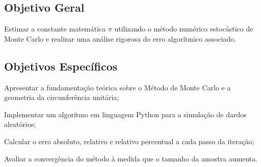 \subsection{Objetivo Geral}
Estimar a constante matemática \texorpdfstring{$\pi$}{pi} utilizando o método numérico estocástico de Monte Carlo e realizar uma análise rigorosa do erro algorítmico associado.

\subsection{Objetivos Específicos}
\begin{alineas}
    \item Apresentar a fundamentação teórica sobre o Método de Monte Carlo e a geometria da circunferência unitária;
    \item Implementar um algoritmo em linguagem Python para a simulação de dardos aleatórios;
    \item Calcular o erro absoluto, relativo e relativo percentual a cada passo da iteração;
    \item Avaliar a convergência do método à medida que o tamanho da amostra aumenta.
\end{alineas}